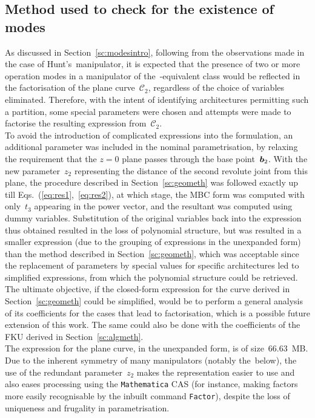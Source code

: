 \documentclass[DD]{iitmdiss}
\newcommand{\mref}[1]{\ref{#1}}
\begin{document}
\subsection{Method used to check for the existence of modes}
%
As discussed in Section~\mref{sc:modesintro}, following from the observations made in the case of Hunt's~\rps manipulator, it is expected that the presence of two or more operation modes in a manipulator of the~\rps-equivalent class would be reflected in the factorisation of the plane curve~$\mathcal{C}_2$, regardless of the choice of variables eliminated. Therefore, with the intent of identifying architectures permitting such a partition, some special parameters were chosen and attempts were made to factorise the resulting expression from~$\mathcal{C}_2$. \\
To avoid the introduction of complicated expressions into the formulation, an additional parameter was included in the nominal parametrisation, by relaxing the requirement that the $z = 0$ plane passes through the base point~$\bm{b}_2$. With the new parameter~$z_2$ representing the distance of the second revolute joint from this plane, the procedure described in Section~\mref{sc:geometh} was followed exactly up till Eqs.~(\mref{eq:res1},~\mref{eq:res2}), at which stage, the MBC form was computed with only~$t_3$ appearing in the power vector, and the resultant was computed using dummy variables. Substitution of the original variables back into the expression thus obtained resulted in the loss of polynomial structure, but was resulted in a smaller expression (due to the grouping of expressions in the unexpanded form) than the method described in Section~\mref{sc:geometh}, which was acceptable since the replacement of parameters by special values for specific architectures led to simplified expressions, from which the polynomial structure could be retrieved. The ultimate objective, if the closed-form expression for the curve derived in Section~\mref{sc:geometh} could be simplified, would be to perform a general analysis of its coefficients for the cases that lead to factorisation, which is a possible future extension of this work. The same could also be done with the coefficients of the FKU derived in Section~\mref{sc:algmeth}.\\
The expression for the plane curve, in the unexpanded form, is of size~$66.63$~MB. Due to the inherent symmetry of many manipulators (notably the~\rrs below), the use of the redundant parameter~$z_2$ makes the representation easier to use and also eases processing using the \verb|Mathematica| CAS (for instance, making factors more easily recognisable by the inbuilt command \verb|Factor|), despite the loss of uniqueness and frugality in parametrisation.
%
\end{document}
